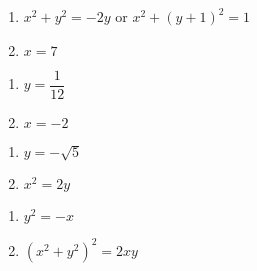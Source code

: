 \begin{multicols}{2}

\begin{enumerate}

\setcounter{enumi}{\value{HW}}

\item $x^2 + y^2 = -2y$ or $x^2+(y+1)^2 = 1$ 
\item  $x=7$  

\setcounter{HW}{\value{enumi}}

\end{enumerate}

\end{multicols}

\begin{multicols}{2}

\begin{enumerate}

\setcounter{enumi}{\value{HW}}

\item  $y = \dfrac{1}{12}$
\item  $x = -2$ 

\setcounter{HW}{\value{enumi}}

\end{enumerate}

\end{multicols}

\begin{multicols}{2}

\begin{enumerate}

\setcounter{enumi}{\value{HW}}

\item  $y= -\sqrt{5}$
\item  $x^2=2y$

\setcounter{HW}{\value{enumi}}

\end{enumerate}

\end{multicols}

\begin{multicols}{2}

\begin{enumerate}

\setcounter{enumi}{\value{HW}}

\item  $y^2=-x$
\item  $\left( x^{2} + y^{2} \right)^{2} = 2xy$

\setcounter{HW}{\value{enumi}}

\end{enumerate}

\end{multicols}

